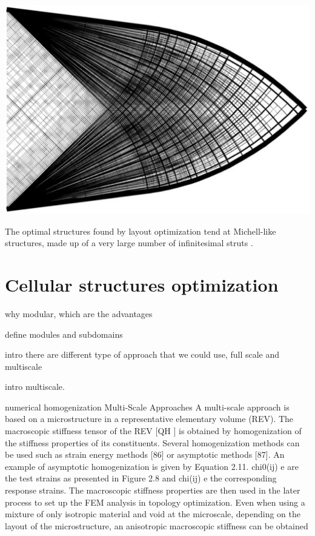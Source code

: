 \begin{marginfigure}
    \centering
    \includegraphics[width=\linewidth]{figures/03_comparison_TO_TTO/truss-ex.png}
    \caption{The optimal structures found by layout optimization tend at Michell-like structures, made up of a very large number of infinitesimal struts \cite{gilbert_layout_2003}.}
    \label{fig:03_truss-ex}
\end{marginfigure}

\section{Cellular structures optimization}
why modular, which are the advantages

define modules and subdomains

intro there are different type of approach that we could use, full scale and multiscale

intro multiscale.

numerical homogenization
Multi-Scale Approaches
A multi-scale approach is based on a microstructure in a representative elementary volume (REV). The
macroscopic stiffness tensor of the REV [QH ] is obtained by homogenization of the stiffness properties of its
constituents. Several homogenization methods can be used such as strain energy methods [86] or asymptotic
methods [87]. An example of asymptotic homogenization is given by Equation 2.11. chi0(ij)
e are the test strains
as presented in Figure 2.8 and chi(ij)
e the corresponding response strains. The macroscopic stiffness properties
are then used in the later process to set up the FEM analysis in topology optimization. Even when using a
mixture of only isotropic material and void at the microscale, depending on the layout of the microstructure,
an anisotropic macroscopic stiffness can be obtained

